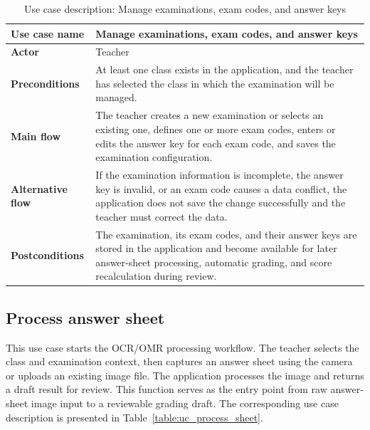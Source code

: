 \documentclass[../Main.tex]{subfiles}
\begin{document}
\begin{table}[H]
    \centering
    \caption{Use case description: Manage examinations, exam codes, and answer keys}
    \label{table:uc_manage_exams}
    \renewcommand{\arraystretch}{1.25}
    \begin{tabular}{|p{}|p{}|}
        \hline
        \textbf{Use case name} & Manage examinations, exam codes, and answer keys \\
        \hline
        \textbf{Actor} & Teacher \\
        \hline
        \textbf{Preconditions} & At least one class exists in the application, and the teacher has selected the class in which the examination will be managed. \\
        \hline
        \textbf{Main flow} & The teacher creates a new examination or selects an existing one, defines one or more exam codes, enters or edits the answer key for each exam code, and saves the examination configuration. \\
        \hline
        \textbf{Alternative flow} & If the examination information is incomplete, the answer key is invalid, or an exam code causes a data conflict, the application does not save the change successfully and the teacher must correct the data. \\
        \hline
        \textbf{Postconditions} & The examination, its exam codes, and their answer keys are stored in the application and become available for later answer-sheet processing, automatic grading, and score recalculation during review. \\
        \hline
    \end{tabular}
\end{table}

\subsection{Process answer sheet}
\label{subsection:2.3.3}

This use case starts the OCR/OMR processing workflow. The teacher selects the
class and examination context, then captures an answer sheet using the camera or uploads
an existing image file. The application processes the image and returns a draft result
for review. This function serves as the entry point from raw answer-sheet image
input to a reviewable grading draft. The corresponding use case description is
presented in Table~\ref{table:uc_process_sheet}.
\end{document}
